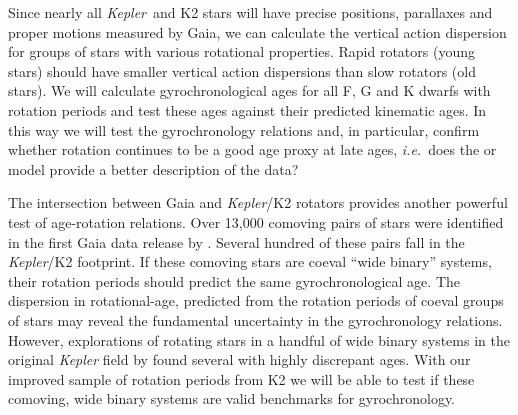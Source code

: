 \documentclass[12pt]{article}
\newcommand{\Kepler}{\textsl{Kepler}\xspace}
\newcommand{\ie}{{\it i.e.}}
\begin{document}
Since nearly all \Kepler\ and K2 stars will have precise positions, parallaxes and proper
motions measured by Gaia, we can calculate the vertical action dispersion for
groups of stars with various rotational properties.
Rapid rotators (young stars) should have smaller vertical action dispersions
than slow rotators (old stars).
We will calculate gyrochronological ages for all F, G and K dwarfs with
rotation periods and test these ages against their predicted kinematic ages.
In this way we will test the gyrochronology relations and, in particular,
confirm whether rotation continues to be a good age proxy at late ages, \ie\
does the \citet{barnes2003} or \citet{van-saders2016} model provide a
better description of the data?

The intersection between Gaia and \Kepler/K2 rotators provides another powerful test of age-rotation relations.
Over 13,000 comoving pairs of stars were identified in the first Gaia data
release by \citet{Oh2016}.
Several hundred of these pairs fall in the \Kepler/K2 footprint.
If these comoving stars are coeval ``wide binary'' systems, their rotation periods should predict the same gyrochronological age.
The dispersion in rotational-age, predicted from the rotation periods of
coeval groups of stars may reveal the fundamental uncertainty in the
gyrochronology relations. However, explorations of rotating stars in a handful of wide binary systems in the original \Kepler field by \citet{janes2016} found several with highly discrepant ages. With our improved sample of rotation periods from K2 we will be able to test if these comoving, wide binary systems are valid benchmarks for gyrochronology.
\end{document}
